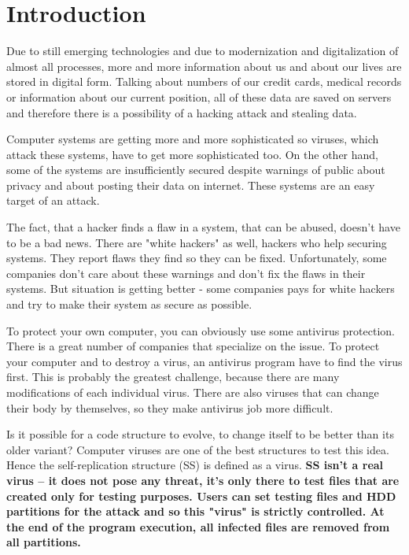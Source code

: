 \documentclass[review]{elsarticle}
\begin{document}

\section{Introduction}
Due to still emerging technologies and due to modernization and digitalization of almost all processes, more and more information about us and about our lives are stored in digital form. Talking about numbers of our credit cards, medical records or information about our current position, all of these data are saved on servers and therefore there is a possibility of a hacking attack and stealing data. 

Computer systems are getting more and more sophisticated so viruses, which attack these systems, have to get more sophisticated too. On the other hand, some of the systems are insufficiently secured despite warnings of public about privacy and about posting their data on internet. These systems are an easy target of an attack.

The fact, that a hacker finds a flaw in a system, that can be abused, doesn't have to be a bad news. There are "white hackers" as well, hackers who help securing systems. They report flaws they find so they can be fixed. Unfortunately, some companies don't care about these warnings and don't fix the flaws in their systems. But situation is getting better - some companies pays for white hackers and try to make their system as secure as possible. 

To protect your own computer, you can obviously use some antivirus protection. There is a great number of companies that specialize on the issue. To protect your computer and to destroy a virus, an antivirus program have to find the virus first. This is probably the greatest challenge, because there are many modifications of each individual virus. There are also viruses that can change their body by themselves, so they make antivirus job more difficult.

Is it possible for a code structure to evolve, to change itself to be better than its older variant? Computer viruses are one of the best structures to test this idea. Hence the self-replication structure (SS) is defined as a virus. \textbf{SS isn't a real virus -- it does not pose any threat, it's only there to test files that are created only for testing purposes. Users can set testing files and HDD partitions for the attack and so this "virus" is strictly controlled. At the end of the program execution, all infected files are removed from all partitions.}
\end{document}
